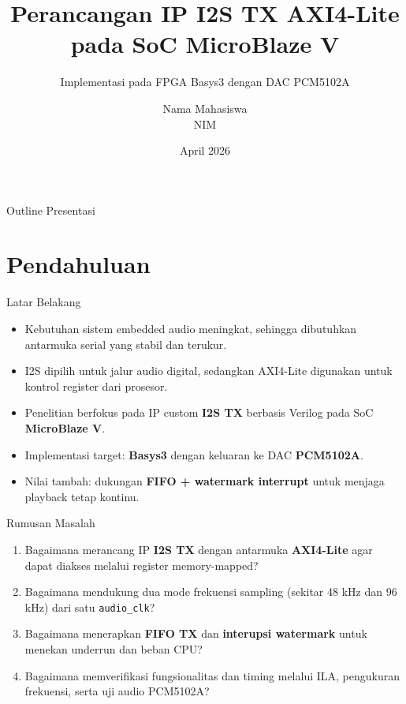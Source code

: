 \documentclass[aspectratio=169]{beamer}
\title{Perancangan IP I2S TX AXI4-Lite pada SoC MicroBlaze V}
\subtitle{Implementasi pada FPGA Basys3 dengan DAC PCM5102A}
\author{Nama Mahasiswa \\ NIM}
\institute{Departemen Teknik Elektro dan Teknologi Informasi\\Universitas Gadjah Mada}
\date{April 2026}
\begin{document}
\begin{frame}
  \titlepage
\end{frame}

\begin{frame}{Outline Presentasi}
  \tableofcontents
\end{frame}

\section{Pendahuluan}

\begin{frame}{Latar Belakang}
  \begin{itemize}
    \item Kebutuhan sistem embedded audio meningkat, sehingga dibutuhkan antarmuka serial yang stabil dan terukur.
    \item I2S dipilih untuk jalur audio digital, sedangkan AXI4-Lite digunakan untuk kontrol register dari prosesor.
    \item Penelitian berfokus pada IP custom \textbf{I2S TX} berbasis Verilog pada SoC \textbf{MicroBlaze V}.
    \item Implementasi target: \textbf{Basys3} dengan keluaran ke DAC \textbf{PCM5102A}.
    \item Nilai tambah: dukungan \textbf{FIFO + watermark interrupt} untuk menjaga playback tetap kontinu.
  \end{itemize}
\end{frame}

\begin{frame}{Rumusan Masalah}
  \begin{enumerate}
    \item Bagaimana merancang IP \textbf{I2S TX} dengan antarmuka \textbf{AXI4-Lite} agar dapat diakses melalui register memory-mapped?
    \item Bagaimana mendukung dua mode frekuensi sampling (sekitar 48 kHz dan 96 kHz) dari satu \texttt{audio\_clk}?
    \item Bagaimana menerapkan \textbf{FIFO TX} dan \textbf{interupsi watermark} untuk menekan underrun dan beban CPU?
    \item Bagaimana memverifikasi fungsionalitas dan timing melalui ILA, pengukuran frekuensi, serta uji audio PCM5102A?
  \end{enumerate}
\end{frame}
\end{document}
